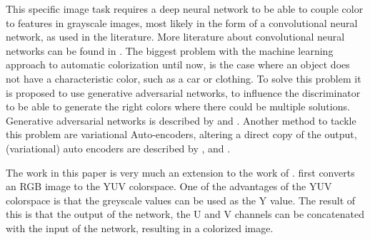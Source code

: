 This specific image task requires a deep neural network to be able to couple color to features in grayscale images, most likely in the form of a convolutional neural network, as used in the literature. More literature about convolutional neural networks can be found in \cite{GoodfellowBOOK}. The biggest problem with the machine learning approach to automatic colorization until now, is the case where an object does not have a characteristic color, such as a car or clothing. To solve this problem it is proposed to use generative adversarial networks, to influence the discriminator to be able to generate the right colors where there could be multiple solutions. Generative adversarial networks is described by \cite{Goodfellow} and \cite{Radford}. Another method to tackle this problem are variational Auto-encoders, altering a direct copy of the output, (variational) auto encoders are described by \cite{Gregor}, \cite{Kingma} and \cite{GoodfellowBOOK}.

The work in this paper is very much an extension to the work of \cite{Dahl}. \cite{Dahl} first converts an RGB image to the YUV colorspace. One of the advantages of the YUV colorspace is that the greyscale values can be used as the Y value. The result of this is that the output of the network, the U and V channels can be concatenated with the input of the network, resulting in a colorized image.